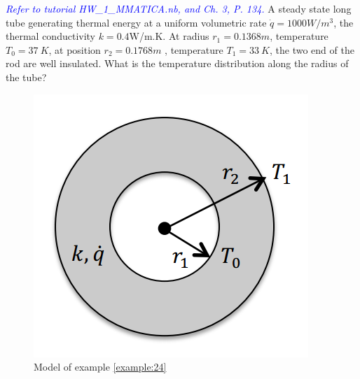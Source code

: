 \begin{example}
\label{example:24}
\textcolor{blue} {\emph{Refer to tutorial HW\_1\_MMATICA.nb, and Ch. 3, P. 134.}}
A steady state long tube generating thermal energy at a uniform volumetric rate
$\dot{q}=1000W/m^3$, the thermal conductivity $k=0.4$W/m.K.
At radius $r_1=0.1368m$, temperature $T_0=37~K$, at position $r_2=0.1768m$
, temperature $T_1=33~K$, the two end of the rod are well insulated.
What is the temperature distribution along the radius of the tube?
\begin{figure}[ht!]
  \centering
    \includegraphics[scale=0.6]{figures/ch2/8}
    \caption{Model of example \ref{example:24}}
    \label{fig:2:8}
\end{figure}
\end{example}


